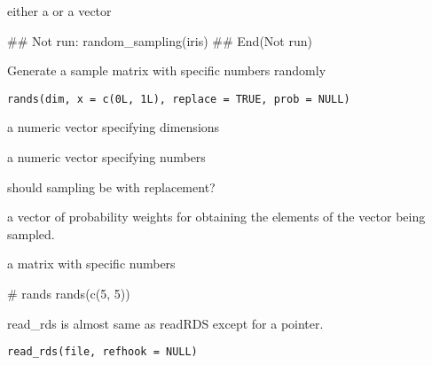 \documentclass[letterpaper]{book}
\begin{document}
%
\begin{Value}
either a  or a vector
\end{Value}
%
\begin{Examples}
\begin{ExampleCode}
## Not run: 
random_sampling(iris)
## End(Not run)

\end{ExampleCode}
\end{Examples}
%
\begin{Description}
Generate a sample matrix with specific numbers randomly
\end{Description}
%
\begin{Usage}
\begin{verbatim}
rands(dim, x = c(0L, 1L), replace = TRUE, prob = NULL)
\end{verbatim}
\end{Usage}
%
\begin{Arguments}
\begin{ldescription}
\item[\code{dim}] a numeric vector specifying dimensions

\item[\code{x}] a numeric vector specifying numbers

\item[\code{replace}] should sampling be with replacement?

\item[\code{prob}] a vector of probability weights for obtaining the elements of the vector being sampled.
\end{ldescription}
\end{Arguments}
%
\begin{Value}
a matrix with specific numbers
\end{Value}
%
\begin{Examples}
\begin{ExampleCode}
# rands
rands(c(5, 5))

\end{ExampleCode}
\end{Examples}
%
\begin{Description}
read\_rds is almost same as readRDS except for a pointer.
\end{Description}
%
\begin{Usage}
\begin{verbatim}
read_rds(file, refhook = NULL)
\end{verbatim}
\end{Usage}
\end{document}
